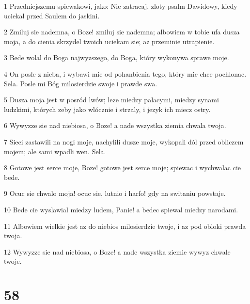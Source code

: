 \par 1 Przedniejszemu spiewakowi, jako: Nie zatracaj, zloty psalm Dawidowy, kiedy uciekal przed Saulem do jaskini.
\par 2 Zmiluj sie nademna, o Boze! zmiluj sie nademna; albowiem w tobie ufa dusza moja, a do cienia skrzydel twoich uciekam sie; az przeminie utrapienie.
\par 3 Bede wolal do Boga najwyzszego, do Boga, który wykonywa sprawe moje.
\par 4 On posle z nieba, i wybawi mie od pohanbienia tego, który mie chce pochlonac. Sela. Posle mi Bóg milosierdzie swoje i prawde swa.
\par 5 Dusza moja jest w posród lwów; leze miedzy palacymi, miedzy synami ludzkimi, których zeby jako wlócznie i strzaly, i jezyk ich miecz ostry.
\par 6 Wywyzze sie nad niebiosa, o Boze! a nade wszystka ziemia chwala twoja.
\par 7 Sieci zastawili na nogi moje, nachylili dusze moje, wykopali dól przed obliczem mojem; ale sami wpadli wen. Sela.
\par 8 Gotowe jest serce moje, Boze! gotowe jest serce moje; spiewac i wychwalac cie bede.
\par 9 Ocuc sie chwalo moja! ocuc sie, lutnio i harfo! gdy na switaniu powstaje.
\par 10 Bede cie wyslawial miedzy ludem, Panie! a bedec spiewal miedzy narodami.
\par 11 Albowiem wielkie jest az do niebios milosierdzie twoje, i az pod obloki prawda twoja.
\par 12 Wywyzze sie nad niebiosa, o Boze! a nade wszystka ziemie wywyz chwale twoje.

\chapter{58}

